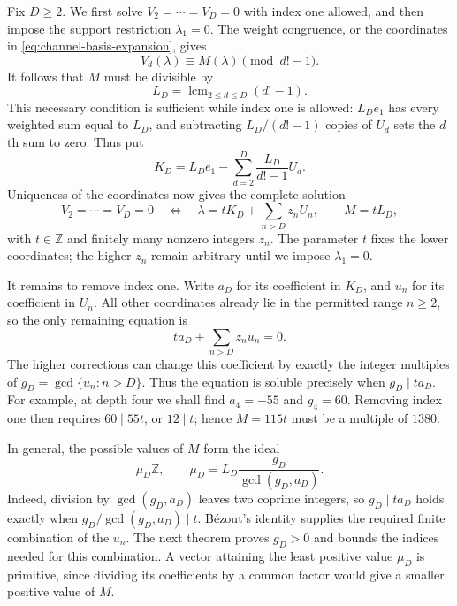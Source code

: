 \documentclass[11pt]{article}
\begin{document}
Fix $D\ge2$. We first solve $V_2=\cdots=V_D=0$ with index one allowed,
and then impose the support restriction $\lambda_1=0$.
The weight congruence, or the coordinates in
\eqref{eq:channel-basis-expansion}, gives
\begin{equation}
 V_d(\lambda)\equiv M(\lambda)\pmod{d!-1}.
 \label{res:congruence}
\end{equation}
It follows that $M$ must be divisible by
\[
 L_D=\operatorname{lcm}_{2\le d\le D}(d!-1).
\]
This necessary condition is sufficient while index one is allowed:
$L_De_1$ has every weighted sum equal to $L_D$, and subtracting
$L_D/(d!-1)$ copies of $U_d$ sets the $d$th sum to zero. Thus put
\[
 K_D=L_De_1-\sum_{d=2}^D\frac{L_D}{d!-1}U_d.
\]
Uniqueness of the coordinates now gives the complete solution
\begin{equation}
 V_2=\cdots=V_D=0
 \quad\Longleftrightarrow\quad
 \lambda=tK_D+\sum_{n>D}z_nU_n,\qquad M=tL_D,
 \label{eq:low-channel-classification}
\end{equation}
with $t\in\mathbb Z$ and finitely many nonzero integers $z_n$.
The parameter $t$ fixes the lower coordinates; the higher $z_n$ remain
arbitrary until we impose $\lambda_1=0$.

It remains to remove index one. Write $a_D$ for its coefficient in
$K_D$, and $u_n$ for its coefficient in $U_n$. All other coordinates
already lie in the permitted range $n\ge2$, so the only remaining
equation is
\begin{equation}
 ta_D+\sum_{n>D}z_nu_n=0.
 \label{eq:support-equation}
\end{equation}
The higher corrections can change this coefficient by exactly the
integer multiples of
$g_D=\gcd\{u_n:n>D\}$. Thus the equation is soluble precisely when
$g_D\mid ta_D$.
For example, at depth four we shall find $a_4=-55$ and $g_4=60$.
Removing index one then requires $60\mid55t$, or $12\mid t$;
hence $M=115t$ must be a multiple of $1380$.

In general, the possible values of $M$ form the ideal
\begin{equation}
 \mu_D\mathbb Z,\qquad
 \mu_D=L_D\frac{g_D}{\gcd(g_D,a_D)}.
 \label{eq:attainable-moment-ideal}
\end{equation}
Indeed, division by $\gcd(g_D,a_D)$ leaves two coprime integers, so
$g_D\mid ta_D$ holds exactly when $g_D/\gcd(g_D,a_D)\mid t$.
B\'ezout's identity supplies the required finite combination of the
$u_n$. The next theorem proves $g_D>0$ and bounds the indices needed
for this combination. A vector attaining the least positive value $\mu_D$ is primitive,
since dividing its coefficients by a common factor would give a smaller
positive value of $M$.
\end{document}
